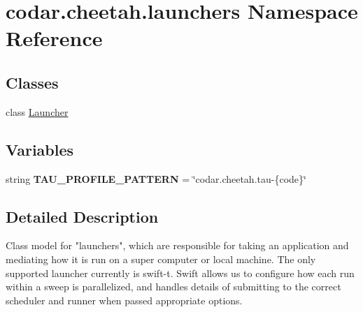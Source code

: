 \hypertarget{namespacecodar_1_1cheetah_1_1launchers}{}\section{codar.\+cheetah.\+launchers Namespace Reference}
\label{namespacecodar_1_1cheetah_1_1launchers}
\subsection*{Classes}
\begin{DoxyCompactItemize}
\item 
class \hyperlink{classcodar_1_1cheetah_1_1launchers_1_1_launcher}{Launcher}
\end{DoxyCompactItemize}
\subsection*{Variables}
\begin{DoxyCompactItemize}
\item 
\mbox{\label{namespacecodar_1_1cheetah_1_1launchers_a0e2d5331be8a9825f80a5e720b8fe93f}} 
string {\bfseries T\+A\+U\+\_\+\+P\+R\+O\+F\+I\+L\+E\+\_\+\+P\+A\+T\+T\+E\+RN} = \char`\"{}codar.\+cheetah.\+tau-\/\{code\}\char`\"{}
\end{DoxyCompactItemize}


\subsection{Detailed Description}
\begin{DoxyVerb}Class model for "launchers", which are responsible for taking an application
and mediating how it is run on a super computer or local machine. The only
supported launcher currently is swift-t. Swift allows us to configure how
each run within a sweep is parallelized, and handles details of submitting to
the correct scheduler and runner when passed appropriate options.
\end{DoxyVerb}
 